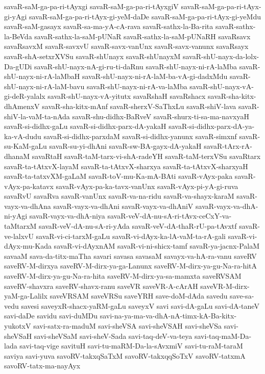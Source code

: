 {savaR-saM-ga-pa-ri-tAyxgi
savaR-saM-ga-pa-ri-tAyxgiV
savaR-saM-ga-pa-ri-tAyx-gi-yAgi
savaR-saM-ga-pa-ri-tAyx-gi-yeM-daDe
savaR-saM-ga-pa-ri-tAyx-gi-yeMdu
savaR-saM-gasayx
savaR-sa-ma-yA-cA-rava
savaR-sathx-la-Ba-rita
savaR-sathx-la-BeVda
savaR-sathx-la-saM-pUNaR
savaR-sathx-la-saM-pUNaRH
savaRsavx
savaRsavxM
savaR-savxvU
savaR-savx-vanUnx
savaR-savx-vanunx
savaRsayx
savaR-shA-setxrXVSu
savaR-shUnayx
savaR-shUnayxM
savaR-shU-nayx-da-lolx-Da-gUDi
savaR-shU-nayx-nA-gi-ru-ti-daRnu
savaR-shU-nayx-ni-rA-laMba
savaR-shU-nayx-ni-rA-laMbaH
savaR-shU-nayx-ni-rA-laM-ba-vA-gi-dadxMdu
savaR-shU-nayx-ni-rA-laM-bavu
savaR-shU-nayx-ni-rA-va-laMba
savaR-shU-nayx-vA-gi-deR-yalalx
savaR-shU-nayx-vA-yitutx
savaRshaH
savaRshacx
savaR-sha-kitx-dhAmenxV
savaR-sha-kitx-mAnf
savaR-sherxV-SaThxLu
savaR-shiV-lava
savaR-shiV-la-vaM-ta-nAda
savaR-shu-didhx-BaRveV
savaR-shurx-ti-sa-ma-navxyaH
savaR-si-didhx-gaLu
savaR-si-didhx-parx-dA-yakaH
savaR-si-didhx-parx-dA-ya-ka-vA-dudu
savaR-si-didhx-parxdaM
savaR-si-didhx-yanunx
savaR-simxnf
savaR-su-KaM-gaLu
savaR-su-yi-dhAni
savaR-sw-BA-gayx-dA-yakaH
savaR-tArx-rA-dhanaM
savaRtaH
savaR-taM-tarx-vi-shA-radeYH
savaR-taM-terxVSu
savaRtarx
savaR-ta-tAtxvX-layaM
savaR-ta-tAtxvX-sharxya
savaR-ta-tAtxvX-sharxyaH
savaR-ta-tatxvXM-gaLaM
savaR-toV-mu-Ka-mA-BAti
savaR-vAyx-paka
savaR-vAyx-pa-katavx
savaR-vAyx-pa-ka-tavx-vanUnx
savaR-vAyx-pi-yA-gi-ruva
savaRvU
savaRva
savaR-vanUnx
savaR-va-na-ridu
savaR-va-shayx-karaM
savaR-vayx-va-dhAna
savaR-vayx-va-dhAni
savaR-vayx-va-dhAniV
savaR-vayx-va-dhA-ni-yAgi
savaR-vayx-va-dhA-niya
savaR-veV-dA-nu-sA-ri-tAvx-ceCxY-va-taMtarxM
savaR-veV-dA-nu-sA-ri-yAda
savaR-veV-dA-thaR-rU-pa-tAvxtf
savaR-ve-lalxvU
savaR-vi-ci-tarxM-gaLu
savaR-vi-dAyx-ka-lA-vaM-ta-rA-gali
savaR-vi-dAyx-mu-Kada
savaR-vi-dAyxnAM
savaR-vi-ni-shicx-tamf
savaR-ya-jacnx-PalaM
savaaM
sava-da-titx-maTha
savari
savasa
savasaM
savayx-va-hA-ra-vanu
saveRV
saveRV-M-dirxya
saveRV-M-dirx-ya-ga-Lanunx
saveRV-M-dirx-ya-gu-Na-ra-hitA
saveRV-M-dirx-ya-gu-Na-ra-hita
saveRV-M-dirx-ya-sa-mamxta
saveRVSAM
saveRV-shavxra
saveRV-shavx-ranu
saveVR
saveVR-A-cArAH
saveVR-M-dirx-yaM-ga-Lalilx
saveVRSAM
saveVRSu
saveYRH
save-doM-dAda
savedu
save-sa-vedu
savesi
saveyxR-shacx-yaRM-gaLu
saveyxV
savi
savi-dA-gaLu
savi-dA-taneV
savi-daDe
savidu
savi-duMDu
savi-na-ya-ma-va-dhA-nA-timx-kA-Ba-kitx-yukotxV
savi-satx-ra-maduM
savi-sheVSA
savi-sheVSAH
savi-sheVSa
savi-sheVSaH
savi-sheVSaM
savi-sheV-Sada
savi-taq-deV-va-teya
savi-taq-maM-Da-lada
savi-taq-vige
savituH
savi-tu-maRM-Da-la-sAvxmiV
savi-tu-raM-taraM
saviya
savi-yuva
savoRV-takxqSaTxM
savoRV-takxqqSoTxV
savoRV-tatxmA
savoRV-tatx-ma-nayAyx
}
